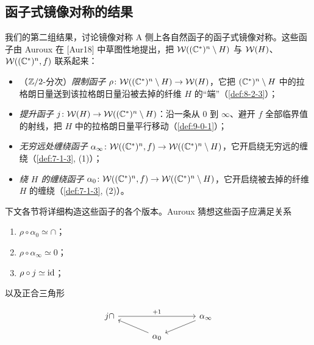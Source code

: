 \subsection{函子式镜像对称的结果}

我们的第二组结果，讨论镜像对称 A 侧上各自然函子的函子式镜像对称。这些函子由 Auroux 在 [Aur18] 中草图性地提出，把 $\mathcal{W}((\mathbb{C}^*)^n\setminus H)$ 与 $\mathcal{W}(H)$、$\mathcal{W}((\mathbb{C}^*)^n,f)$ 联系起来：
\begin{itemize}
\item （$\mathbb{Z}/2$-分次）\emph{限制函子} $\rho\colon\mathcal{W}((\mathbb{C}^*)^n\setminus H)\to\mathcal{W}(H)$，它把 $(\mathbb{C}^*)^n\setminus H$ 中的拉格朗日量送到该拉格朗日量沿被去掉的纤维 $H$ 的“端”（\ref{def:8-2-3}）；
\item \emph{提升函子} $j\colon\mathcal{W}(H)\to\mathcal{W}((\mathbb{C}^*)^n\setminus H)$：沿一条从 $0$ 到 $\infty$、避开 $f$ 全部临界值的射线，把 $H$ 中的拉格朗日量平行移动（\ref{def:9-0-1}）；
\item \emph{无穷远处缠绕函子} $\alpha_\infty\colon\mathcal{W}((\mathbb{C}^*)^n,f)\to\mathcal{W}((\mathbb{C}^*)^n\setminus H)$，它开启绕无穷远的缠绕（\ref{def:7-1-3}, (1)）；
\item \emph{绕 $H$ 的缠绕函子} $\alpha_0\colon\mathcal{W}((\mathbb{C}^*)^n,f)\to\mathcal{W}((\mathbb{C}^*)^n\setminus H)$，它开启绕被去掉的纤维 $H$ 的缠绕（\ref{def:7-1-3}, (2)）。
\end{itemize}
下文各节将详细构造这些函子的各个版本。Auroux 猜想这些函子应满足关系
\begin{enumerate}
\item $\rho\circ\alpha_0\simeq\cap$；
\item $\rho\circ\alpha_\infty\simeq 0$；
\item $\rho\circ j\simeq\mathrm{id}$；
\end{enumerate}
以及正合三角形



\[
\begin{tikzcd}[row sep=1.0em, column sep=3.6em]
{j\cap} \arrow[rr,"+1"] & & \alpha_\infty \arrow[dl] \\
& \alpha_0 \arrow[ul] &
\end{tikzcd}
\]

